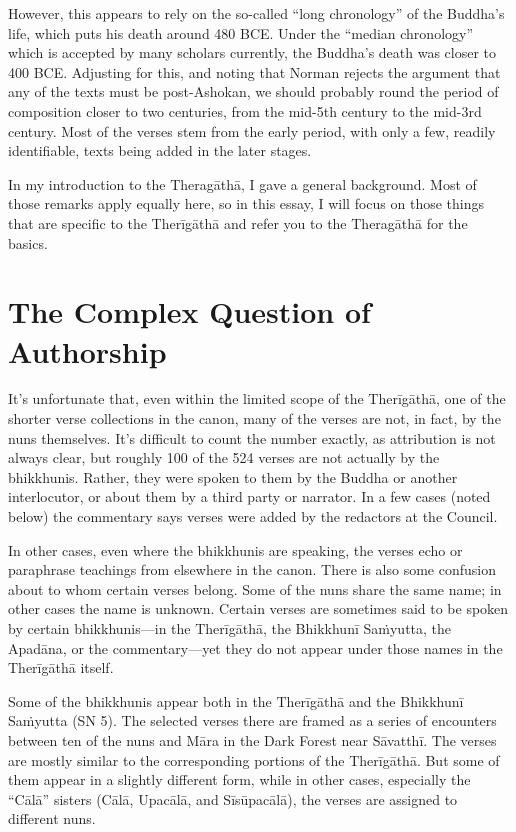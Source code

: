 \documentclass[12pt,openany]{book}%
\begin{document}
However, this appears to rely on the so-called “long chronology” of the Buddha’s life, which puts his death around 480 BCE. Under the “median chronology” which is accepted by many scholars currently, the Buddha’s death was closer to 400 BCE. Adjusting for this, and noting that Norman rejects the argument that any of the texts must be post-Ashokan, we should probably round the period of composition closer to two centuries, from the mid-5th century to the mid-3rd century. Most of the verses stem from the early period, with only a few, readily identifiable, texts being added in the later stages.

In my introduction to the \textsanskrit{Theragāthā}, I gave a general background. Most of those remarks apply equally here, so in this essay, I will focus on those things that are specific to the \textsanskrit{Therīgāthā} and refer you to the \textsanskrit{Theragāthā} for the basics.

\section*{The Complex Question of Authorship}

It’s unfortunate that, even within the limited scope of the \textsanskrit{Therīgāthā}, one of the shorter verse collections in the canon, many of the verses are not, in fact, by the nuns themselves. It’s difficult to count the number exactly, as attribution is not always clear, but roughly 100 of the 524 verses are not actually by the bhikkhunis. Rather, they were spoken to them by the Buddha or another interlocutor, or about them by a third party or narrator. In a few cases (noted below) the commentary says verses were added by the redactors at the Council.

In other cases, even where the bhikkhunis are speaking, the verses echo or paraphrase teachings from elsewhere in the canon. There is also some confusion about to whom certain verses belong. Some of the nuns share the same name; in other cases the name is unknown. Certain verses are sometimes said to be spoken by certain bhikkhunis—in the \textsanskrit{Therīgāthā}, the \textsanskrit{Bhikkhunī} \textsanskrit{Saṁyutta}, the \textsanskrit{Apadāna}, or the commentary—yet they do not appear under those names in the \textsanskrit{Therīgāthā} itself.

Some of the bhikkhunis appear both in the \textsanskrit{Therīgāthā} and the \textsanskrit{Bhikkhunī} \textsanskrit{Saṁyutta} (SN 5). The selected verses there are framed as a series of encounters between ten of the nuns and \textsanskrit{Māra} in the Dark Forest near \textsanskrit{Sāvatthī}. The verses are mostly similar to the corresponding portions of the \textsanskrit{Therīgāthā}. But some of them appear in a slightly different form, while in other cases, especially the “\textsanskrit{Cālā}” sisters (\textsanskrit{Cālā}, \textsanskrit{Upacālā}, and \textsanskrit{Sīsūpacālā}), the verses are assigned to different nuns.
\end{document}
